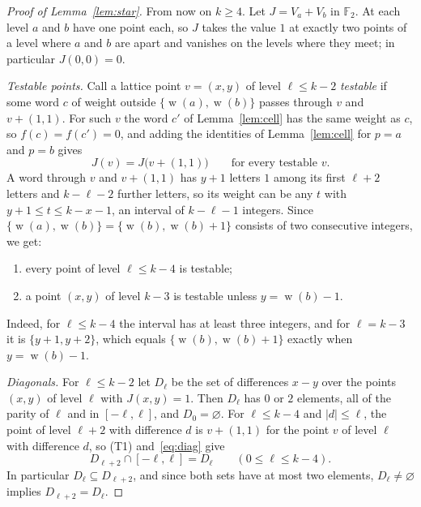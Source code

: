 \documentclass[11pt]{amsart}
\theoremstyle{definition}
\theoremstyle{remark}
\numberwithin{equation}{section}
\newcommand{\F}{\mathbb{F}}
\DeclareMathOperator{\wt}{w}
\begin{document}
\begin{proof}[Proof of Lemma~\ref{lem:star}]
From now on $k\ge4$. Let $J=V_a+V_b$ in $\F_2$. At each level $a$ and $b$ have one point each, so $J$ takes the value $1$ at exactly two points of a level where $a$ and $b$ are apart and vanishes on the levels where they meet; in particular $J(0,0)=0$.

\emph{Testable points.} Call a lattice point $v=(x,y)$ of level $\ell\le k-2$ \emph{testable} if some word $c$ of weight outside $\{\wt(a),\wt(b)\}$ passes through $v$ and $v+(1,1)$. For such $v$ the word $c'$ of Lemma~\ref{lem:cell} has the same weight as $c$, so $f(c)=f(c')=0$, and adding the identities of Lemma~\ref{lem:cell} for $p=a$ and $p=b$ gives
\begin{equation}\label{eq:diag}
J(v)=J\bigl(v+(1,1)\bigr)\qquad\text{for every testable }v .
\end{equation}
A word through $v$ and $v+(1,1)$ has $y+1$ letters $1$ among its first $\ell+2$ letters and $k-\ell-2$ further letters, so its weight can be any $t$ with $y+1\le t\le k-x-1$, an interval of $k-\ell-1$ integers. Since $\{\wt(a),\wt(b)\}=\{\wt(b),\wt(b)+1\}$ consists of two consecutive integers, we get:
\begin{enumerate}[label=\textup{(T\arabic*)}]
\item every point of level $\ell\le k-4$ is testable;
\item a point $(x,y)$ of level $k-3$ is testable unless $y=\wt(b)-1$.
\end{enumerate}
Indeed, for $\ell\le k-4$ the interval has at least three integers, and for $\ell=k-3$ it is $\{y+1,y+2\}$, which equals $\{\wt(b),\wt(b)+1\}$ exactly when $y=\wt(b)-1$.

\emph{Diagonals.} For $\ell\le k-2$ let $D_\ell$ be the set of differences $x-y$ over the points $(x,y)$ of level $\ell$ with $J(x,y)=1$. Then $D_\ell$ has $0$ or $2$ elements, all of the parity of $\ell$ and in $[-\ell,\ell]$, and $D_0=\varnothing$. For $\ell\le k-4$ and $|d|\le\ell$, the point of level $\ell+2$ with difference $d$ is $v+(1,1)$ for the point $v$ of level $\ell$ with difference $d$, so (T1) and~\eqref{eq:diag} give
\begin{equation}\label{eq:D}
D_{\ell+2}\cap[-\ell,\ell]=D_\ell\qquad(0\le\ell\le k-4).
\end{equation}
In particular $D_\ell\subseteq D_{\ell+2}$, and since both sets have at most two elements, $D_\ell\ne\varnothing$ implies $D_{\ell+2}=D_\ell$.


\end{proof}
\end{document}

